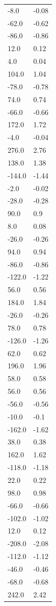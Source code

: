 \begin{longtable}{ll}
-8.0 & -0.08 \\
-62.0 & -0.62 \\
-86.0 & -0.86 \\
12.0 & 0.12 \\
4.0 & 0.04 \\
104.0 & 1.04 \\
-78.0 & -0.78 \\
74.0 & 0.74 \\
-66.0 & -0.66 \\
172.0 & 1.72 \\
-4.0 & -0.04 \\
276.0 & 2.76 \\
138.0 & 1.38 \\
-144.0 & -1.44 \\
-2.0 & -0.02 \\
-28.0 & -0.28 \\
90.0 & 0.9 \\
8.0 & 0.08 \\
-26.0 & -0.26 \\
94.0 & 0.94 \\
-86.0 & -0.86 \\
-122.0 & -1.22 \\
56.0 & 0.56 \\
184.0 & 1.84 \\
-26.0 & -0.26 \\
78.0 & 0.78 \\
-126.0 & -1.26 \\
62.0 & 0.62 \\
196.0 & 1.96 \\
58.0 & 0.58 \\
56.0 & 0.56 \\
-56.0 & -0.56 \\
-10.0 & -0.1 \\
-162.0 & -1.62 \\
38.0 & 0.38 \\
162.0 & 1.62 \\
-118.0 & -1.18 \\
22.0 & 0.22 \\
98.0 & 0.98 \\
-66.0 & -0.66 \\
-102.0 & -1.02 \\
12.0 & 0.12 \\
-208.0 & -2.08 \\
-112.0 & -1.12 \\
-46.0 & -0.46 \\
-68.0 & -0.68 \\
242.0 & 2.42 \\

\end{longtable}
